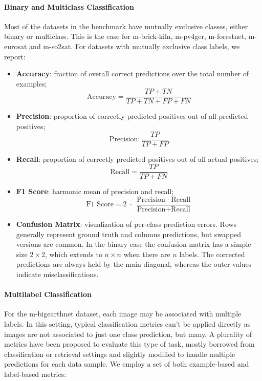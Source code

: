 \documentclass[a4paper, twoside, english]{sapthesis} %
\begin{document}
\paragraph{Binary and Multiclass Classification}

Most of the datasets in the benchmark have mutually exclusive classes, either binary or multiclass. This is the case for m-brick-kiln, m-pv4ger, m-forestnet, m-eurosat and m-so2sat. For datasets with mutually exclusive class labels, we report:

\begin{itemize}
    \item \textbf{Accuracy}: fraction of overall correct predictions over the total number of examples;
    $$
    \text{Accuracy} = \frac{TP + TN}{TP + TN + FP + FN}
    $$
    \item \textbf{Precision}: proportion of correctly predicted positives out of all predicted positives;
    $$
    \text{Precision}: \frac{TP}{TP + FP}
    $$
    \item \textbf{Recall}: proportion of correctly predicted positives out of all actual positives;
    $$
    \text{Recall} = \frac{TP}{TP + FN}
    $$
    \item \textbf{F1 Score}: harmonic mean of precision and recall;
    $$
    \text{F1 Score} = 2 \;\cdot\; \frac{\text{Precision} \;\cdot\; \text{Recall}}{\text{Precision} + \text{Recall}}
    $$
    \item \textbf{Confusion Matrix}: visualization of per-class prediction errors. Rows generally represent ground truth and columns predictions, but swapped versions are common. In the binary case the confusion matrix has a simple size $2\times2$, which extends to $n \times n$ when there are $n$ labels. The corrected predictions are always held by the main diagonal, whereas the outer values indicate misclassifications.
\end{itemize}

\paragraph{Multilabel Classification} For the m-bigearthnet dataset, each image may be associated with multiple labels. In this setting, typical classification metrics can't be applied directly as images are not associated to just one class prediction, but many. A plurality of metrics \cite{zhang2013review} have been proposed to evaluate this type of task, mostly borrowed from classification or retrieval settings and slightly modified to handle multiple predictions for each data sample. We employ a set of both example-based and label-based metrics:
\end{document}
